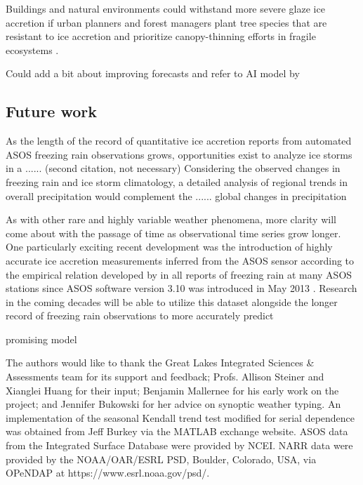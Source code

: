 \documentclass[twocol]{ametsoc}
\begin{document}
Buildings and natural environments could withstand more severe glaze ice accretion if urban planners and forest managers plant tree species that are resistant to ice accretion and prioritize canopy-thinning efforts in fragile ecosystems \citep{hauer2006trees}.

Could add a bit about improving forecasts and refer to AI model by \citet{swaminathan2015modeling}

\subsection{Future work}
As the length of the record of quantitative ice accretion reports from automated ASOS freezing rain observations grows, opportunities exist to analyze ice storms in a ...... \citet{ryerson2007quantitative} (second citation, not necessary)
Considering the observed changes in freezing rain and ice storm climatology, a detailed analysis of regional trends in overall precipitation would complement the ...... global changes in precipitation \citet{westra2013global}

As with other rare and highly variable weather phenomena, more clarity will come about with the passage of time as observational time series grow longer. One particularly exciting recent development was the introduction of highly accurate ice accretion measurements inferred from the ASOS sensor according to the empirical relation developed by \cite{ryerson2007quantitative} in all reports of freezing rain at many ASOS stations since ASOS software version 3.10 was introduced in May 2013 \citep{nws2013}. Research in the coming decades will be able to utilize this dataset alongside the longer record of freezing rain observations to more accurately predict 


\citet{sanders2016analysis} promising model



%
\acknowledgments
The authors would like to thank the Great Lakes Integrated Sciences \& Assessments team for its support and feedback; Profs. Allison Steiner and Xianglei Huang for their input;  Benjamin Mallernee for his early work on the project; and Jennifer Bukowski for her advice on synoptic weather typing. An implementation of the seasonal Kendall trend test modified for serial dependence was obtained from Jeff Burkey via the MATLAB exchange website. ASOS data from the Integrated Surface Database were provided by NCEI. NARR data were provided by the NOAA/OAR/ESRL PSD, Boulder, Colorado, USA, via OPeNDAP at https://www.esrl.noaa.gov/psd/.  
\end{document}

